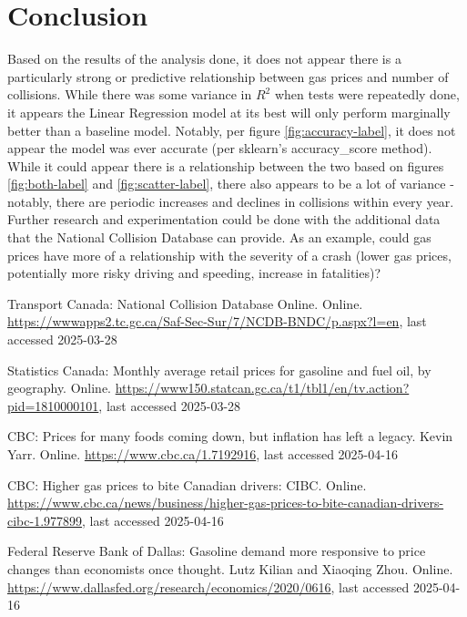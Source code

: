 \documentclass[runningheads]{llncs}
\begin{document}
\section{Conclusion}
Based on the results of the analysis done, it does not appear there is a particularly strong or predictive relationship between gas prices and number of collisions. While there was some variance in \(R^2\) when tests were repeatedly done, it appears the Linear Regression model at its best will only perform marginally better than a baseline model. Notably, per figure \ref{fig:accuracy-label}, it does not appear the model was ever accurate (per sklearn's accuracy\_score method). While it could appear there is a relationship between the two based on figures \ref{fig:both-label} and \ref{fig:scatter-label}, there also appears to be a lot of variance - notably, there are periodic increases and declines in collisions within every year. Further research and experimentation could be done with the additional data that the National Collision Database\cite{ref_url1} can provide. As an example, could gas prices have more of a relationship with the severity of a crash (lower gas prices, potentially more risky driving and speeding, increase in fatalities)? 
%
%
%
% 
% 
%
\begin{thebibliography}{8}
Transport Canada: National Collision Database Online. Online. \url{https://wwwapps2.tc.gc.ca/Saf-Sec-Sur/7/NCDB-BNDC/p.aspx?l=en}, last accessed 2025-03-28

Statistics Canada: Monthly average retail prices for gasoline and fuel oil, by geography. Online. \url{https://www150.statcan.gc.ca/t1/tbl1/en/tv.action?pid=1810000101}, last accessed 2025-03-28

CBC: Prices for many foods coming down, but inflation has left a legacy. Kevin Yarr. Online. \url{https://www.cbc.ca/1.7192916}, last accessed 2025-04-16

CBC: Higher gas prices to bite Canadian drivers: CIBC. Online. \url{https://www.cbc.ca/news/business/higher-gas-prices-to-bite-canadian-drivers-cibc-1.977899}, last accessed 2025-04-16

Federal Reserve Bank of Dallas: Gasoline demand more responsive to price changes than economists once thought. Lutz Kilian and Xiaoqing Zhou. Online. \url{https://www.dallasfed.org/research/economics/2020/0616}, last accessed 2025-04-16

\end{thebibliography}
\end{document}

